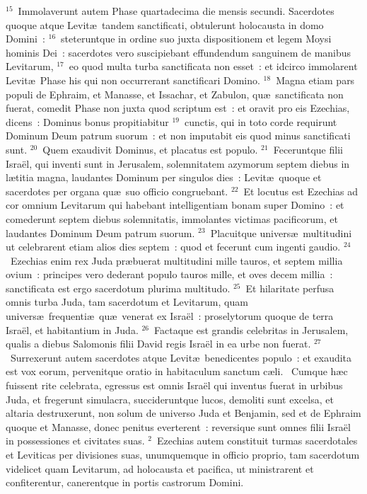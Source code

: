 ${}^{15}$~Immolaverunt autem Phase quartadecima die mensis secundi. Sacerdotes quoque atque Levit\ae\ tandem sanctificati, obtulerunt holocausta in domo Domini~:
${}^{16}$~steteruntque in ordine suo juxta dispositionem et legem Moysi hominis Dei~: sacerdotes vero suscipiebant effundendum sanguinem de manibus Levitarum,
${}^{17}$~eo quod multa turba sanctificata non esset~: et idcirco immolarent Levit\ae\ Phase his qui non occurrerant sanctificari Domino.
${}^{18}$~Magna etiam pars populi de Ephraim, et Manasse, et Issachar, et Zabulon, qu\ae\ sanctificata non fuerat, comedit Phase non juxta quod scriptum est~: et oravit pro eis Ezechias, dicens~: Dominus bonus propitiabitur
${}^{19}$~cunctis, qui in toto corde requirunt Dominum Deum patrum suorum~: et non imputabit eis quod minus sanctificati sunt.
${}^{20}$~Quem exaudivit Dominus, et placatus est populo.
${}^{21}$~Feceruntque filii Isra\"el, qui inventi sunt in Jerusalem, solemnitatem azymorum septem diebus in l\ae titia magna, laudantes Dominum per singulos dies~: Levit\ae\ quoque et sacerdotes per organa qu\ae\ suo officio congruebant.
${}^{22}$~Et locutus est Ezechias ad cor omnium Levitarum qui habebant intelligentiam bonam super Domino~: et comederunt septem diebus solemnitatis, immolantes victimas pacificorum, et laudantes Dominum Deum patrum suorum.
${}^{23}$~Placuitque univers\ae\ multitudini ut celebrarent etiam alios dies septem~: quod et fecerunt cum ingenti gaudio.
${}^{24}$~Ezechias enim rex Juda pr\ae buerat multitudini mille tauros, et septem millia ovium~: principes vero dederant populo tauros mille, et oves decem millia~: sanctificata est ergo sacerdotum plurima multitudo.
${}^{25}$~Et hilaritate perfusa omnis turba Juda, tam sacerdotum et Levitarum, quam univers\ae\ frequenti\ae\ qu\ae\ venerat ex Isra\"el~: proselytorum quoque de terra Isra\"el, et habitantium in Juda.
${}^{26}$~Factaque est grandis celebritas in Jerusalem, qualis a diebus Salomonis filii David regis Isra\"el in ea urbe non fuerat.
${}^{27}$~Surrexerunt autem sacerdotes atque Levit\ae\ benedicentes populo~: et exaudita est vox eorum, pervenitque oratio in habitaculum sanctum c\ae li.
~Cumque h\ae c fuissent rite celebrata, egressus est omnis Isra\"el qui inventus fuerat in urbibus Juda, et fregerunt simulacra, succideruntque lucos, demoliti sunt excelsa, et altaria destruxerunt, non solum de universo Juda et Benjamin, sed et de Ephraim quoque et Manasse, donec penitus everterent~: reversique sunt omnes filii Isra\"el in possessiones et civitates suas.
${}^{2}$~Ezechias autem constituit turmas sacerdotales et Leviticas per divisiones suas, unumquemque in officio proprio, tam sacerdotum videlicet quam Levitarum, ad holocausta et pacifica, ut ministrarent et confiterentur, canerentque in portis castrorum Domini.

